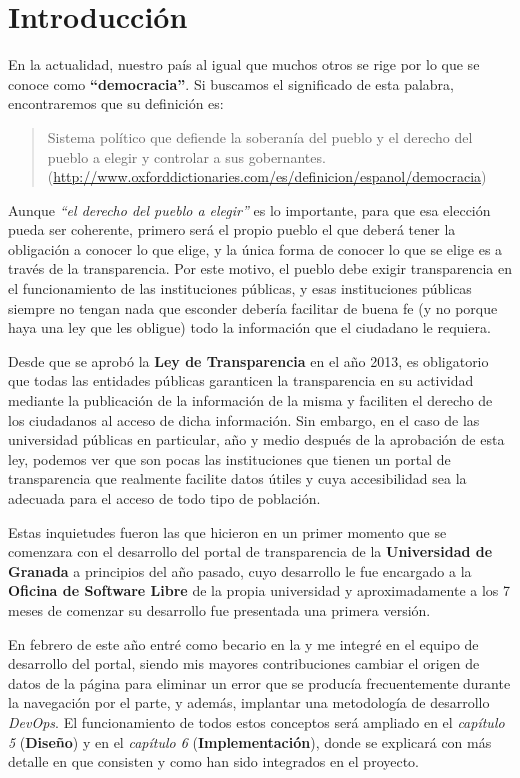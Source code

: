 \chapter{Introducción}

En la actualidad, nuestro país al igual que muchos otros se rige por lo que se conoce como \textbf{``democracia''}. Si buscamos
el significado de esta palabra, encontraremos que su definición es: 

\begin{quote}Sistema político que defiende la soberanía del pueblo y el derecho del pueblo a elegir y controlar a sus gobernantes.
\newline(\url{http://www.oxforddictionaries.com/es/definicion/espanol/democracia})
\end{quote}

Aunque \textit{``el derecho del pueblo a elegir''} es lo importante, para que esa elección pueda ser coherente, primero será el propio pueblo el que deberá tener la obligación a conocer lo que elige, y la única forma de conocer lo que se elige es a través de la transparencia. Por este motivo, el pueblo debe exigir transparencia en el funcionamiento de las instituciones públicas, y esas instituciones públicas siempre no tengan nada que esconder debería facilitar de buena fe (y no porque haya una ley que les obligue) todo la información que el ciudadano le requiera.

\bigskip
Desde que se aprobó la \textbf{Ley de Transparencia} en el año 2013, es obligatorio que todas las entidades públicas garanticen la transparencia en su actividad mediante la publicación de la información de la misma y faciliten el derecho de los ciudadanos al acceso de dicha información. Sin embargo, en el caso de las universidad públicas en particular, año y medio después de la aprobación de esta ley, podemos ver que son pocas las instituciones que tienen un portal de transparencia que realmente facilite datos útiles y cuya accesibilidad sea la adecuada para el acceso de todo tipo de población.

\bigskip
Estas inquietudes fueron las que hicieron en un primer momento que se comenzara con el desarrollo del portal de transparencia de la \textbf{Universidad de Granada} a principios del año pasado, cuyo desarrollo le fue encargado a la \textbf{Oficina de Software Libre} de la propia universidad y aproximadamente a los 7 meses de comenzar su desarrollo fue presentada una primera versión.

\bigskip
En febrero de este año entré como becario en la  y me integré en el equipo de desarrollo del portal, siendo mis mayores contribuciones cambiar el origen de datos de la página para eliminar un error que se producía frecuentemente durante la navegación por el parte, y además, implantar una metodología de desarrollo \textit{DevOps}. El funcionamiento de todos estos conceptos será ampliado en el \textit{capítulo 5} (\textbf{Diseño}) y en el \textit{capítulo 6} (\textbf{Implementación}), donde se explicará con más detalle en que consisten y como han sido integrados en el proyecto.

